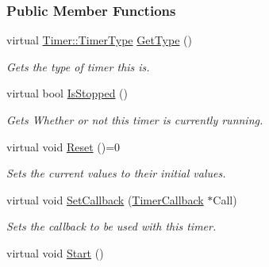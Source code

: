 \subsubsection*{Public Member Functions}
\begin{DoxyCompactItemize}
\item 
virtual \hyperlink{classMezzanine_1_1Timer_afdc9cac008cfe642ce8a11d090f29ec6}{Timer::TimerType} \hyperlink{classMezzanine_1_1Timer_a58083b89492615c5aab7d32caa151d7b}{GetType} ()
\begin{DoxyCompactList}\small\item\em Gets the type of timer this is. \item\end{DoxyCompactList}\item 
\hypertarget{classMezzanine_1_1Timer_ae9234cbfc7a02fb2130bbf4bb790c27d}{
virtual bool \hyperlink{classMezzanine_1_1Timer_ae9234cbfc7a02fb2130bbf4bb790c27d}{IsStopped} ()}
\label{classMezzanine_1_1Timer_ae9234cbfc7a02fb2130bbf4bb790c27d}

\begin{DoxyCompactList}\small\item\em Gets Whether or not this timer is currently running. \item\end{DoxyCompactList}\item 
\hypertarget{classMezzanine_1_1Timer_a40bfabc6c9b213cc3d98e96d029fae98}{
virtual void \hyperlink{classMezzanine_1_1Timer_a40bfabc6c9b213cc3d98e96d029fae98}{Reset} ()=0}
\label{classMezzanine_1_1Timer_a40bfabc6c9b213cc3d98e96d029fae98}

\begin{DoxyCompactList}\small\item\em Sets the current values to their initial values. \item\end{DoxyCompactList}\item 
virtual void \hyperlink{classMezzanine_1_1Timer_a065f49422924ce93dcc2e25b2e059e3b}{SetCallback} (\hyperlink{classMezzanine_1_1TimerCallback}{TimerCallback} $\ast$Call)
\begin{DoxyCompactList}\small\item\em Sets the callback to be used with this timer. \item\end{DoxyCompactList}\item 
\hypertarget{classMezzanine_1_1Timer_a971737d83ba98db13b7cabb4213cbca5}{
virtual void \hyperlink{classMezzanine_1_1Timer_a971737d83ba98db13b7cabb4213cbca5}{Start} ()}
\label{classMezzanine_1_1Timer_a971737d83ba98db13b7cabb4213cbca5}


\end{DoxyCompactItemize}
